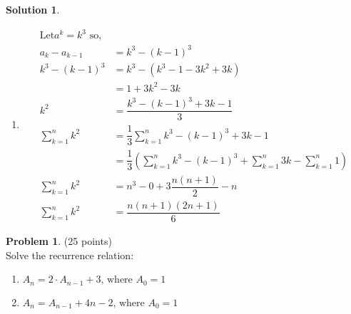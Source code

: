 \documentclass{article}
\theoremstyle{definition}
\newtheorem{problem}{Problem}
\newtheorem*{solution}{Solution}
\begin{document}
\begin{solution}
\begin{enumerate}
  \item
  \begin{equation*}
    \begin{aligned}
      \text{Let} a^k = k^3 \text{ so,}\\
      a_k - a_{k-1} &= k^3 - (k-1)^3 \\
      k^3 - (k-1)^3 &= k^3 - (k^3 - 1 -3k^2 +3k) \\
       &= 1 + 3k^2 -3k \\
       k^2 &= \dfrac{k^3 - (k-1)^3 + 3k -1}{3} \\
       \sum_{k=1}^n k^2 &= \dfrac{1}{3}\sum_{k=1}^n k^3 - (k-1)^3 + 3k -1 \\
       &= \dfrac{1}{3}(\sum_{k=1}^n k^3 - (k-1)^3 +\sum_{k=1}^n 3k -\sum_{k=1}^n1 ) \\
       \sum_{k=1}^n k^2 &= n^3 - 0 + 3\dfrac{n(n+1)}{2} - n \\
       \sum_{k=1}^n k^2 &= \dfrac{n(n+1)(2n+1)}{6}
    \end{aligned}
  \end{equation*}
\end{enumerate}
\end{solution}



\newpage

\begin{problem} (25 points)\\
Solve the recurrence relation:
\begin{enumerate}
\item $A_n = 2\cdot A_{n-1} + 3 \text{, where } A_0 = 1$
\item $A_n = A_{n-1} + 4n - 2\text{, where } A_0 = 1$
\end{enumerate}
\end{problem}
\end{document}
